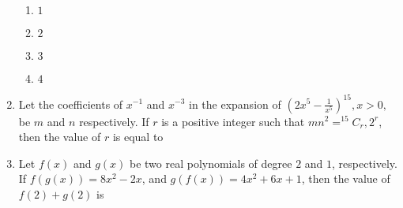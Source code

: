 \documentclass[journal,12pt,onecolumn]{IEEEtran}
\theoremstyle{remark}
\begin{document}
\begin{enumerate}
\begin{enumerate}
    \item $1$
    \item $2$
    \item $3$
    \item $4$
\end{enumerate}
\item Let the coefficients of $x^{-1}$ and $x^{-3}$ in the expansion of $\left( 2x^5 - \frac{1}{x^5} \right)^{15}, x > 0,$ be $m$ and $n$ respectively. If $r$ is a positive integer such that $mn^2 = ^{15}C_r, 2^r$, then the value of $r$ is equal to
\item Let $f(x)$ and $g(x)$ be two real polynomials of degree $2$ and $1$, respectively. If $f(g(x)) = 8x^2 - 2x$, and $g(f(x)) = 4x^2 + 6x + 1$, then the value of $f(2) + g(2)$ is
\end{enumerate}
\end{document}
